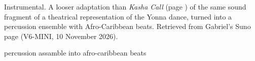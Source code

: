
\label{sec:call-of-lore}
\begin{notes}
Instrumental. A looser adaptation than \emph{Kasha Call} (page \pageref{sec:kasha-call}) of the same sound fragment of a theatrical representation of the Yonna dance, turned into a percussion ensemble with Afro-Caribbean beats. Retrieved from Gabriel's Suno page (V6-MINI, 10 November 2026).
\end{notes}
\begin{style}
percussion assamble into afro-caribbean beats
\end{style}
\begin{lyrics}



\end{lyrics}

